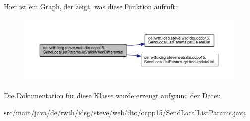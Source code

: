 Hier ist ein Graph, der zeigt, was diese Funktion aufruft\-:
\nopagebreak
\begin{figure}[H]
\begin{center}
\leavevmode
\includegraphics[width=350pt]{classde_1_1rwth_1_1idsg_1_1steve_1_1web_1_1dto_1_1ocpp15_1_1_send_local_list_params_af7879e85d278508abf6aa14a3ee34d06_cgraph}
\end{center}
\end{figure}




Die Dokumentation für diese Klasse wurde erzeugt aufgrund der Datei\-:\begin{DoxyCompactItemize}
\item 
src/main/java/de/rwth/idsg/steve/web/dto/ocpp15/\hyperlink{_send_local_list_params_8java}{Send\-Local\-List\-Params.\-java}\end{DoxyCompactItemize}
